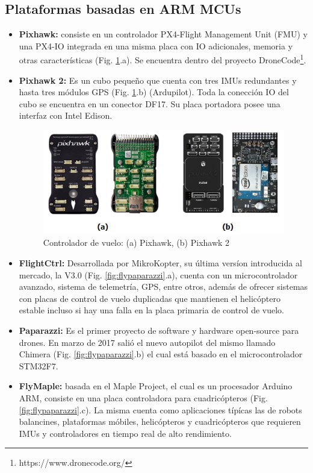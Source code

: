 \subsection{Plataformas basadas en ARM MCUs}
\begin{itemize}
    \item \textbf{Pixhawk:} consiste en un controlador PX4-Flight Management Unit (FMU) y una PX4-IO integrada en una misma placa con IO adicionales, memoria y otras características (Fig. \ref{fig:pixhawks}.a). Se encuentra dentro del proyecto DroneCode\footnote{https://www.dronecode.org/}.
    \item \textbf{Pixhawk 2:} Es un cubo pequeño que cuenta con tres IMUs redundantes y hasta tres módulos GPS (Fig. \ref{fig:pixhawks}.b) (Ardupilot). Toda la conección IO del cubo se encuentra en un conector DF17. Su placa portadora posee una interfaz con Intel Edison.
    
    \begin{figure}[!ht]
        \centering
        \includegraphics[width=.95\textwidth]{Img/pixhawks}
        \caption{Controlador de vuelo: (a) Pixhawk, (b) Pixhawk 2}
        \label{fig:pixhawks}
    \end{figure}
    
    \item \textbf{FlightCtrl:} Desarrollada por MikroKopter, su última versíon introducida al mercado, la V3.0 (Fig. \ref{fig:flypaparazzi}.a), cuenta con un microcontrolador avanzado, sistema de telemetría, GPS, entre otros, además de ofrecer sistemas con placas de control de vuelo duplicadas que mantienen el helicóptero estable incluso si hay una falla en la placa primaria de control de vuelo.
    \item \textbf{Paparazzi:} Es el primer proyecto de software y hardware open-source para drones. En marzo de 2017 salió el nuevo autopilot del mismo llamado Chimera (Fig. \ref{fig:flypaparazzi}.b) el cual está basado en el microcontrolador STM32F7.
    \item \textbf{FlyMaple:} basada en el Maple Project, el cual es un procesador Arduino ARM, consiste en una placa controladora para cuadricópteros (Fig. \ref{fig:flypaparazzi}.c). La misma cuenta como aplicaciones típícas las de robots balancines, plataformas móbiles, helicópteros y cuadricópteros que requieren IMUs y controladores en tiempo real de alto rendimiento.
    

\end{itemize}
